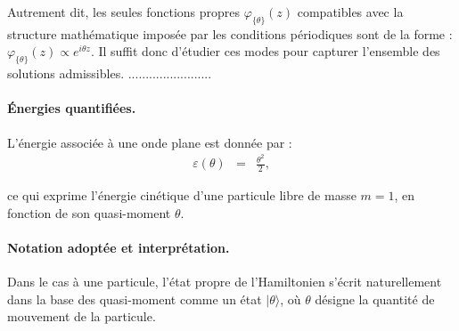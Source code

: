 Autrement dit, les seules fonctions propres \( \varphi_{\{\theta\}}(z) \) compatibles avec la structure mathématique imposée par les conditions périodiques sont de la forme :
\(
\varphi_{\{\theta\}}(z) \propto e^{i \theta z}.
\)
Il suffit donc d’étudier ces modes pour capturer l’ensemble des solutions admissibles.
........................






\paragraph{Énergies quantifiées.}

L’énergie associée à une onde plane est donnée par :
\begin{eqnarray}
	\varepsilon(\theta) & = & \frac{\theta^2}{2},%
\end{eqnarray}

ce qui exprime l’énergie cinétique d’une particule libre de masse $m = 1$, en fonction de son quasi-moment $\theta$.

\paragraph{Notation adoptée et interprétation.}

Dans le cas à une particule, l’état propre de l’Hamiltonien s’écrit naturellement dans la base des quasi-moment comme un état \(\vert \theta \rangle\), où \(\theta\) désigne la quantité de mouvement de la particule.  

